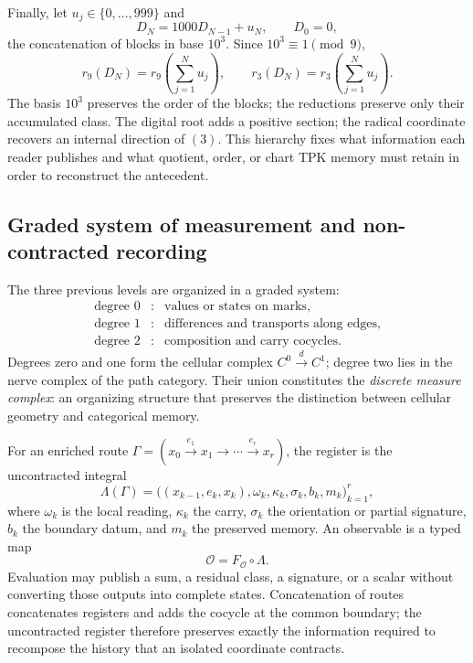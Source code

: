Finally, let \(u_j\in\{0,\ldots,999\}\) and
\[
 D_N=1000D_{N-1}+u_N,
 \qquad D_0=0,
\]
the concatenation of blocks in base \(10^3\). Since \(10^3\equiv1\pmod9\),
\begin{equation}
 r_9(D_N)=r_9\!\left(\sum_{j=1}^{N}u_j\right),
 \qquad
 r_3(D_N)=r_3\!\left(\sum_{j=1}^{N}u_j\right).
 \label{eq:compatibilidad-base-mil-reducciones-rev3}
\end{equation}
The basis \(10^3\) preserves the order of the blocks; the reductions preserve only their accumulated class. The digital root adds a positive section; the radical coordinate recovers an internal direction of \((3)\). This hierarchy fixes what information each reader publishes and what quotient, order, or chart TPK memory must retain in order to reconstruct the antecedent.

\subsection{Graded system of measurement and non-contracted recording}

The three previous levels are organized in a graded system:
\[
 \boxed{
 \begin{array}{ccl}
 \text{degree }0&:&\text{values or states on marks},\\
 \text{degree }1&:&\text{differences and transports along edges},\\
 \text{degree }2&:&\text{composition and carry cocycles}.
 \end{array}}
\]
Degrees zero and one form the cellular complex
\(C^0\xrightarrow d C^1\); degree two lies in the nerve complex of the
path category. Their union constitutes the \emph{discrete
measure complex}: an organizing structure that preserves the distinction between
cellular geometry and categorical memory.

For an enriched route
\(\Gamma=(x_0\xrightarrow{e_1}x_1\to\cdots\xrightarrow{e_r}x_r)\), the
register is the uncontracted integral
\begin{equation}
 \Lambda(\Gamma)
 =\bigl((x_{k-1},e_k,x_k),\omega_k,\kappa_k,\sigma_k,b_k,m_k\bigr)_{k=1}^{r},
 \label{eq:ledger-integral-no-contraida-rev2}
\end{equation}
where \(\omega_k\) is the local reading, \(\kappa_k\) the carry, \(\sigma_k\)
the orientation or partial signature, \(b_k\) the boundary datum, and \(m_k\) the
preserved memory. An observable is a typed map
\[
 \mathcal O=F_{\mathcal O}\circ\Lambda.
\]
Evaluation may publish a sum, a residual class, a signature, or a scalar without converting those outputs into complete states. Concatenation of routes concatenates registers and adds the cocycle at the common boundary; the uncontracted register therefore preserves exactly the information required to recompose the history that an isolated coordinate contracts.

